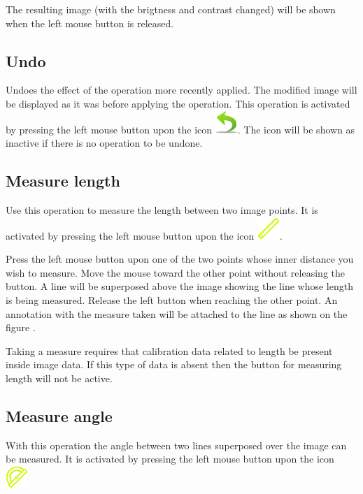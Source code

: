 \documentclass{plantilla-manual-usuario-en}
\begin{document}
The resulting image (with the brigtness and contrast changed) will be shown when the left mouse button is released.

\subsection{Undo}

Undoes the effect of the operation more recently applied. The modified image will be displayed as it was before applying the operation. This operation is activated by pressing the left mouse button upon the icon \includegraphics[scale=0.5]{images/undo.png}. The icon will be shown as inactive if there is no operation to be undone.

\subsection{Measure length}

Use this operation to measure the length between two image points. It is activated by pressing the left mouse button upon the icon \includegraphics[scale=0.5]{images/distance.png}. 

Press the left mouse button upon one of the two points whose inner distance you wish to measure. Move the mouse toward the other point without releasing the button. A line will be superposed above the image showing the line whose length is being measured. Release the left button when reaching the other point. An annotation with the measure taken will be attached to the line as shown on the figure .


Taking a measure requires that calibration data related to length be present inside image data. If this type of data is absent then the button for measuring length will not be active. 

\subsection{Measure angle}

With this operation the angle between two lines superposed over the image can be measured. It is activated by pressing the left mouse button upon the icon \includegraphics[scale=0.5]{images/angle.png}
\end{document}
